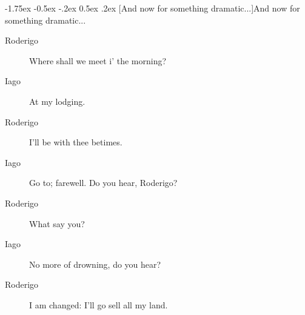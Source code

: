 \documentclass[11pt,twoside]{article}\makeatletter
\makeatletter
\renewcommand\section{\@startsection {section}{1}{\z@}%
     {-1.75ex \@plus -0.5ex \@minus -.2ex}%
     {0.5ex \@plus .2ex}%
     {\reset@font\Large\bfseries\sffamily}}
\renewcommand\subsection{\@startsection{subsection}{2}{\z@}%
     {-1.75ex\@plus -0.5ex \@minus- .2ex}%
     {0.5ex \@plus .2ex}%
     {\reset@font\Large\sffamily}}
\def\DivII{\subsection}
\def\DivII{\section}
\makeatother
\begin{document}
\DivII[And now for something dramatic...]{And now for something dramatic...} \begin{description} \item[Roderigo] 

Where shall we meet i' the morning?\end{description}
 \begin{description} \item[Iago] 

At my lodging.\end{description}
 \begin{description} \item[Roderigo] 

I'll be with thee betimes.\end{description}
 \begin{description} \item[Iago] 

Go to; farewell. Do you hear, Roderigo?\end{description}
 \begin{description} \item[Roderigo] 

What say you?\end{description}
 \begin{description} \item[Iago] 

No more of drowning, do you hear?\end{description}
 \begin{description} \item[Roderigo] 

I am changed: I'll go sell all my land.\end{description}
\end{document}
